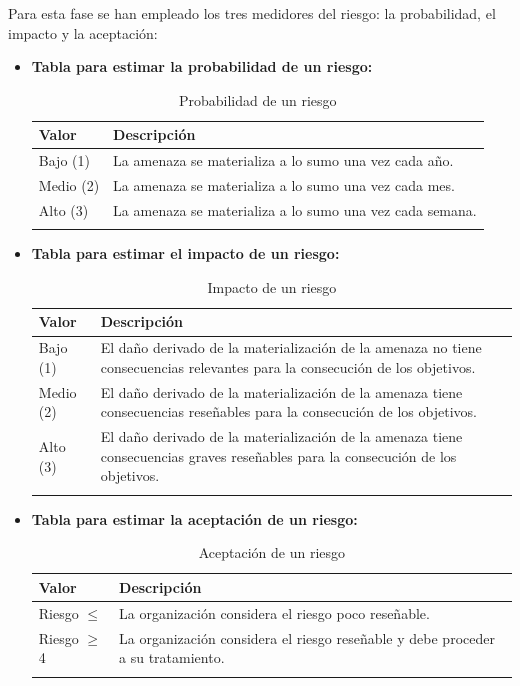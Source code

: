 \begin{enumerate}
Para esta fase se han empleado los tres medidores del riesgo: la probabilidad, el impacto y la aceptación: 

\begin{itemize}

\item{\textbf{Tabla para estimar la probabilidad de un riesgo:}}
\begingroup
\renewcommand\arraystretch{1.3}
\begin{longtable}{l p{13cm}}
\hline
\textbf{Valor} & \textbf{Descripción} \\
\hline
\endhead
\endfoot
Bajo (1) & 
La amenaza se materializa a lo sumo una vez cada año. 
 \\
Medio (2) & 
La amenaza se materializa a lo sumo una vez cada mes.
 \\
Alto (3) & 
La amenaza se materializa a lo sumo una vez cada semana.
 \\
\hline
\caption{Probabilidad de un riesgo}\label{prob_riesgo}\\
\end{longtable}

\item{\textbf{Tabla para estimar el impacto de un riesgo:}}
\begin{longtable}{l p{13cm}}
\hline
\textbf{Valor} & \textbf{Descripción} \\
\hline
\endhead
\endfoot
Bajo (1) & 
El daño derivado de la materialización de la amenaza no tiene consecuencias relevantes para la consecución de los objetivos.  
 \\
Medio (2) & 
El daño derivado de la materialización de la amenaza tiene consecuencias reseñables para la consecución de los objetivos.
 \\
Alto (3) & 
El daño derivado de la materialización de la amenaza tiene consecuencias graves reseñables para la consecución de los objetivos.
 \\
\hline
\caption{Impacto de un riesgo}\label{impacto_riesgo}\\
\end{longtable}

\item{\textbf{Tabla para estimar la aceptación de un riesgo:}}


\begin{longtable}{l p{13cm}}
\hline
\textbf{Valor} & \textbf{Descripción} \\
\hline
\endhead
\endfoot
Riesgo $\leq$ & 
La organización considera el riesgo poco reseñable. 
 \\
Riesgo $\geq$ 4 & 
La organización considera el riesgo reseñable y debe proceder a su tratamiento.
 \\
\hline
\caption{Aceptación de un riesgo}\label{aceptacion_riesgo}\\
\end{longtable}


\end{itemize}
\end{enumerate}

